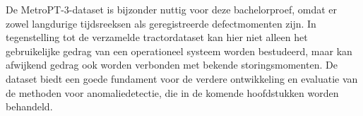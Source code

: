 De MetroPT-3-dataset is bijzonder nuttig voor deze bachelorproef, omdat er zowel langdurige tijdsreeksen als geregistreerde defectmomenten zijn. In tegenstelling tot de verzamelde tractordataset kan hier niet alleen het gebruikelijke gedrag van een operationeel systeem worden bestudeerd, maar kan afwijkend gedrag ook worden verbonden met bekende storingsmomenten. De dataset biedt een goede fundament voor de verdere ontwikkeling en evaluatie van de methoden voor anomaliedetectie, die in de komende hoofdstukken worden behandeld.





